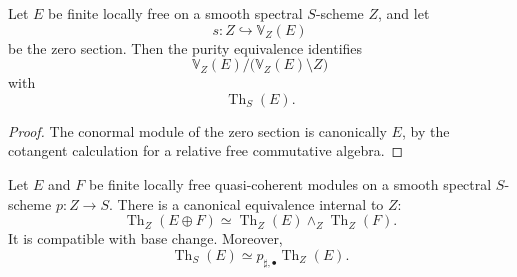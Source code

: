 \begin{corollary}
\label{cor:purity-zero-section}
Let \(E\) be finite locally free on a smooth spectral \(S\)-scheme
\(Z\), and let
\[
    s
    \colon
    Z
    \hookrightarrow
    \mathbb V_Z(E)
\]
be the zero section.  Then the purity equivalence identifies
\[
    \mathbb V_Z(E)/
    \bigl(
        \mathbb V_Z(E)\setminus Z
    \bigr)
\]
with
\[
    \operatorname{Th}_S(E).
\]
\end{corollary}

\begin{proof}
The conormal module of the zero section is canonically \(E\), by the
cotangent calculation for a relative free commutative algebra.
\end{proof}

\begin{proposition}
\label{prop:unstable-thom-multiplicativity}
Let \(E\) and \(F\) be finite locally free quasi-coherent modules on a
smooth spectral \(S\)-scheme \(p:Z\to S\).  There is a canonical
equivalence internal to \(Z\):
\[
    \operatorname{Th}_Z(E\oplus F)
    \simeq
    \operatorname{Th}_Z(E)
    \wedge_Z
    \operatorname{Th}_Z(F).
\]
It is compatible with base change.  Moreover,
\[
    \operatorname{Th}_S(E)
    \simeq
    p_{\sharp,\bullet}
    \operatorname{Th}_Z(E).
\]
\end{proposition}

